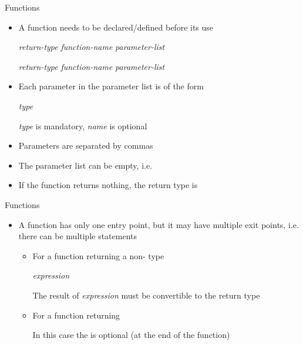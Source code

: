 \begin{frame}{Functions \insertcontinuationtext}

  \begin{itemize}
  \item<1-> A function needs to be declared/defined before its use

    \textit{return-type} \textit{function-name} \code{(} \textit{parameter-list} \code{);}

    \textit{return-type} \textit{function-name} \code{(} \textit{parameter-list} \code{) \{ \ddd \}}


  \item<3-> Each parameter in the parameter list is of the form

    \textit{type }

    \textit{type} is mandatory, \textit{name} is optional

  \item<4-> Parameters are separated by commas

  \item<5-> The parameter list can be empty, i.e. \code{()}
  \item<6-> If the function returns nothing, the return type is 
  \end{itemize}

\end{frame}

\begin{frame}{Functions \insertcontinuationtext}

  \begin{itemize}

  \item<1-> A function has only one entry point, but it may have multiple exit
    points, i.e. there can be multiple  statements

    \begin{itemize}
    \item For a function returning a non- type

       \textit{expression}\code{;}

      The result of \textit{expression} must be convertible to the return type

    \item For a function returning 


      In this case the  is optional (at the end of the function)

    \end{itemize}

  \end{itemize}
\end{frame}

